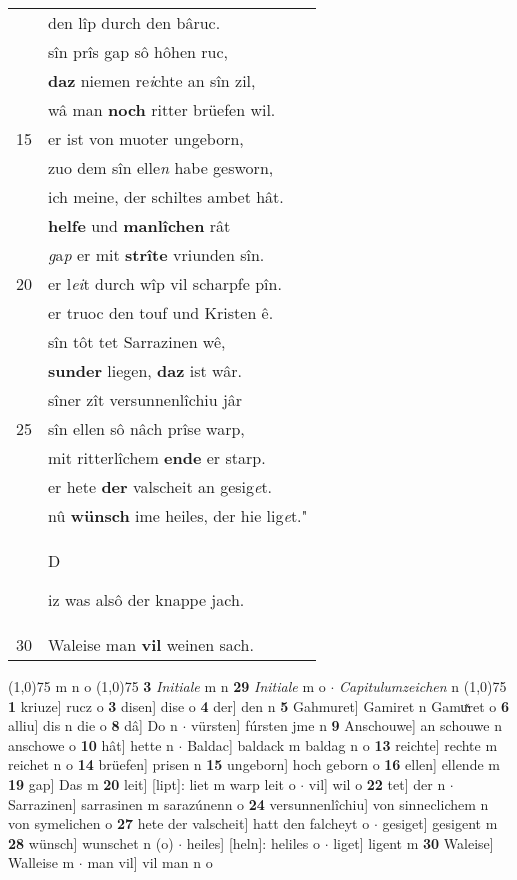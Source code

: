 \documentclass[8pt,a4paper,notitlepage]{article}
\begin{document}
\begin{table}[ht]
\begin{minipage}[t]{0.5\linewidth}
\begin{tabular}{rl}
 & den lîp durch den bâruc.\\ 
 & sîn prîs gap sô hôhen ruc,\\ 
 & \textbf{daz} niemen re\textit{i}chte an sîn zil,\\ 
 & wâ man \textbf{noch} ritter brüefen wil.\\ 
15 & er ist von muoter ungeborn,\\ 
 & zuo dem sîn elle\textit{n} habe gesworn,\\ 
 & ich meine, der schiltes ambet hât.\\ 
 & \textbf{helfe} und \textbf{manlîchen} rât\\ 
 & \textit{g}a\textit{p} er mit \textbf{strîte} vriunden sîn.\\ 
20 & er l\textit{ei}t durch wîp vil scharpfe pîn.\\ 
 & er truoc den touf und Kristen ê.\\ 
 & sîn tôt tet Sarrazinen wê,\\ 
 & \textbf{sunder} liegen, \textbf{daz} ist wâr.\\ 
 & sîner zît versunnenlîchiu jâr\\ 
25 & sîn ellen sô nâch prîse warp,\\ 
 & mit ritterlîchem \textbf{ende} er starp.\\ 
 & er hete \textbf{der} valscheit an gesig\textit{e}t.\\ 
 & nû \textbf{wünsch} ime heiles, der hie lig\textit{e}t."\\ 
 & \begin{large}D\end{large}iz was alsô der knappe jach.\\ 
30 & Waleise man \textbf{vil} weinen sach.\\ 
\end{tabular}
\scriptsize
\line(1,0){75} \newline
m n o \newline
\line(1,0){75} \newline
\textbf{3} \textit{Initiale} m n  \textbf{29} \textit{Initiale} m o   $\cdot$ \textit{Capitulumzeichen} n  \newline
\line(1,0){75} \newline
\textbf{1} kriuze] rucz o \textbf{3} disen] dise o \textbf{4} der] den n \textbf{5} Gahmuret] Gamiret n Gamuͯret o \textbf{6} alliu] dis n die o \textbf{8} dâ] Do n  $\cdot$ vürsten] fúrsten jme n \textbf{9} Anschouwe] an schouwe n anschowe o \textbf{10} hât] hette n  $\cdot$ Baldac] baldack m baldag n o \textbf{13} reichte] rechte m reichet n o \textbf{14} brüefen] prisen n \textbf{15} ungeborn] hoch geborn o \textbf{16} ellen] ellende m \textbf{19} gap] Das m \textbf{20} leit] [lipt]: liet m warp leit o  $\cdot$ vil] wil o \textbf{22} tet] der n  $\cdot$ Sarrazinen] sarrasinen m sarazúnenn o \textbf{24} versunnenlîchiu] von sinneclichem n von symelichen o \textbf{27} hete der valscheit] hatt den falcheyt o  $\cdot$ gesiget] gesigent m \textbf{28} wünsch] wunschet n (o)  $\cdot$ heiles] [heln]: heliles o  $\cdot$ liget] ligent m \textbf{30} Waleise] Walleise m  $\cdot$ man vil] vil man n o \newline

\end{minipage}
\end{table}
\end{document}
